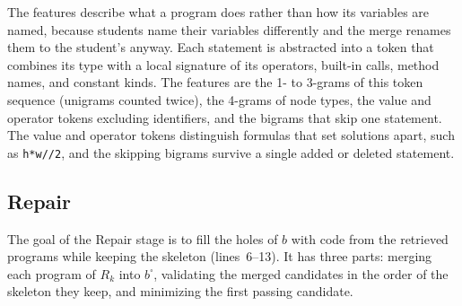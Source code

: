 \documentclass[10pt,conference]{IEEEtran}
\begin{document}
The features describe what a program does rather than how its variables are named, because students name their variables differently and the merge renames them to the student's anyway. Each statement is abstracted into a token that combines its type with a local signature of its operators, built-in calls, method names, and constant kinds. The features are the 1- to 3-grams of this token sequence (unigrams counted twice), the 4-grams of node types, the value and operator tokens excluding identifiers, and the bigrams that skip one statement. The value and operator tokens distinguish formulas that set solutions apart, such as \texttt{h*w//2}, and the skipping bigrams survive a single added or deleted statement.

\subsection{Repair}\label{sec:repair}

The goal of the Repair stage is to fill the holes of $b$ with code from the retrieved programs while keeping the skeleton (lines~6--13). It has three parts: merging each program of $R_k$ into $b^{\square}$, validating the merged candidates in the order of the skeleton they keep, and minimizing the first passing candidate.
\end{document}
